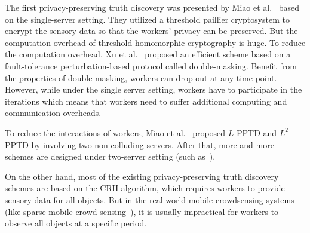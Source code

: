 \documentclass[conference]{IEEEtran}
\begin{document}
The first privacy-preserving truth discovery was presented by Miao et al.~\cite{miao_cloud-enabled_2015} based on the single-server setting.
They utilized a threshold paillier cryptosystem to encrypt the sensory data so that the workers' privacy can be preserved.
But the computation overhead of threshold homomorphic cryptography is huge.
To reduce the computation overhead, Xu et al.~\cite{xu_efficient_2019} proposed an efficient scheme based on a fault-tolerance perturbation-based protocol called double-masking.
Benefit from the properties of double-masking, workers can drop out at any time point.
However, while under the single server setting, workers have to participate in the iterations which means that workers need to suffer additional computing and communication overheads.

To reduce the interactions of workers, Miao et al.~\cite{miao_lightweight_2017} proposed $L$-PPTD and $L^2$-PPTD by involving two non-colluding servers.
After that, more and more schemes are designed under two-server setting (such as~\cite{zhang_lptd_2019,zhang_reliable_2019,xue_inpptd_2020,tang_achieving_2021}).

On the other hand, most of the existing privacy-preserving truth discovery schemes are based on the CRH algorithm, which requires workers to provide sensory data for all objects.
But in the real-world mobile crowdsensing systems (like sparse mobile crowd sensing~\cite{wang_sparse_2016}), it is usually impractical for workers to observe all objects at a specific period.
\end{document}
